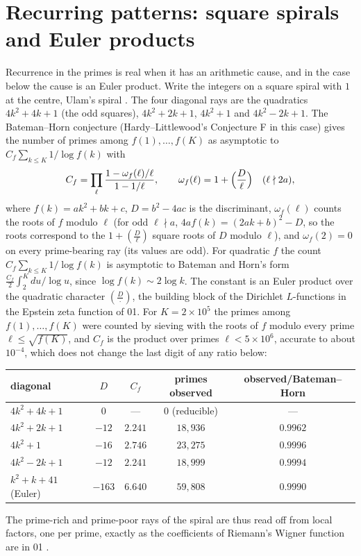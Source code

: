 \documentclass[11pt]{article}
\theoremstyle{definition}\newtheorem{definition}[theorem]{Definition}
\theoremstyle{remark}\newtheorem{remark}[theorem]{Remark}
\begin{document}
\section{Recurring patterns: square spirals and Euler products}\label{sec:spiral}
Recurrence in the primes is real when it has an arithmetic cause, and in the case below the cause is an Euler product. Write the integers on a square spiral with $1$ at the centre, Ulam's spiral \cite{SteinUlamWells}. The four diagonal rays are the quadratics $4k^2+4k+1$ (the odd squares), $4k^2+2k+1$, $4k^2+1$ and $4k^2-2k+1$. The Bateman--Horn conjecture \cite{BatemanHorn} (Hardy--Littlewood's Conjecture F \cite{HardyLittlewood} in this case) gives the number of primes among $f(1),\dots,f(K)$ as asymptotic to $C_f\sum_{k\le K}1/\log f(k)$ with
\[
C_f=\prod_\ell\frac{1-\omega_f(\ell)/\ell}{1-1/\ell},\qquad\omega_f(\ell)=1+\Bigl(\frac D\ell\Bigr)\quad(\ell\nmid2a),
\]
where $f(k)=ak^2+bk+c$, $D=b^2-4ac$ is the discriminant, $\omega_f(\ell)$ counts the roots of $f$ modulo $\ell$ (for odd $\ell\nmid a$, $4af(k)=(2ak+b)^2-D$, so the roots correspond to the $1+(\frac D\ell)$ square roots of $D$ modulo $\ell$), and $\omega_f(2)=0$ on every prime-bearing ray (its values are odd). For quadratic $f$ the count $C_f\sum_{k\le K}1/\log f(k)$ is asymptotic to Bateman and Horn's form $\frac{C_f}2\int_2^K du/\log u$, since $\log f(k)\sim2\log k$. The constant is an Euler product over the quadratic character $(\frac D\cdot)$, the building block of the Dirichlet $L$-functions in the Epstein zeta function of 01. For $K=2\times10^5$ the primes among $f(1),\dots,f(K)$ were counted by sieving with the roots of $f$ modulo every prime $\ell\le\sqrt{f(K)}$, and $C_f$ is the product over primes $\ell<5\times10^6$, accurate to about $10^{-4}$, which does not change the last digit of any ratio below:
\begin{center}\small
\begin{tabular}{@{}lcccc@{}}\toprule
diagonal & $D$ & $C_f$ & primes observed & observed/Bateman--Horn\\\midrule
$4k^2+4k+1$ & $0$ & --- & $0$ (reducible) & ---\\
$4k^2+2k+1$ & $-12$ & $2.241$ & $18{,}936$ & $0.9962$\\
$4k^2+1$ & $-16$ & $2.746$ & $23{,}275$ & $0.9996$\\
$4k^2-2k+1$ & $-12$ & $2.241$ & $18{,}999$ & $0.9994$\\
$k^2+k+41$ (Euler) & $-163$ & $6.640$ & $59{,}808$ & $0.9990$\\\bottomrule
\end{tabular}
\end{center}
The prime-rich and prime-poor rays of the spiral are thus read off from local factors, one per prime, exactly as the coefficients of Riemann's Wigner function are in 01 \cite{SMath}.
\end{document}

